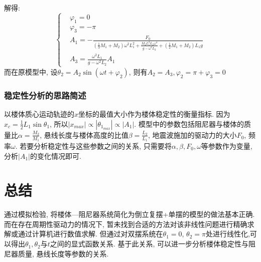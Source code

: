 \documentclass[10.5pt,a4paper]{ctexart}
\begin{document}
解得:
\begin{equation}
\left \{ 
  \begin{aligned}
    &\varphi_1 = 0 \\
    &\varphi_3 = -\pi \\
    &A_1 = - \frac{F_0}{\left(\frac{1}{3}M_1 + M_2\right)\omega^2L_1^2 + \frac{M_2L_1^2L_2\omega^4}{g - \omega^2L_2} + \left(\frac{1}{2}M_1 + M_2\right)L_1g}\\
    &A_3 = \frac{\omega^2L_1}{g - \omega^2L_2} A_1
  \end{aligned}
\right.
\end{equation}
而在原模型中, 设$\theta_2 = A_2\sin{\left(\omega t + \varphi_2\right)}$, 则有$A_2 = A_3, \varphi_2 = \pi + \varphi_3 = 0$
\subsubsection*{稳定性分析的思路简述}
以楼体质心运动轨迹的$x$坐标的最值大小作为楼体稳定性的衡量指标. 因为$\displaystyle x_c = \frac{1}{2}L_1\sin{\theta_1}$, 所以$|x_{max}| \propto |\theta_{1_{max}}| \propto |A_1|$.
模型中的参数包括阻尼器与楼体的质量比$\displaystyle\alpha = \frac{M_2}{M_1}$, 悬线长度与楼体高度的比值$\displaystyle\beta = \frac{L_2}{L_1}$, 地震波施加的驱动力的大小$F_0$, 频率$\omega$.
若要分析稳定性与这些参数之间的关系, 只需要将$\alpha, \beta, F_0, \omega$等参数作为变量, 分析$|A_1|$的变化情况即可.

\section{总结}
通过模拟检验, 将楼体---阻尼器系统简化为倒立复摆+单摆的模型的做法基本正确. 而在存在周期性驱动力的情况下, 暂未找到合适的方法对该非线性问题进行精确求解或通过计算机进行数值求解.
但通过对双摆系统在$\theta_1 = 0$, $\theta_2 = \pi$处进行线性化,可以得出$\theta_1, \theta_2$与$t$之间的显式函数关系. 基于此关系, 可以进一步分析楼体稳定性与阻尼器质量, 悬线长度等参数的关系.
\end{document}

